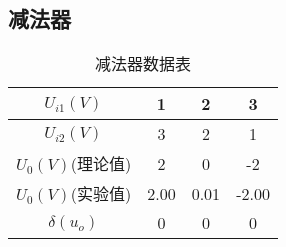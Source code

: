 \documentclass{article}
\begin{document}
      \subsection{减法器}
    \begin{table}[h]
        \centering  
        \begin{tabular}{c|c|c|c}
            \hline
                $U_{i1}(V)$      & 1    & 2   & 3  \\ \hline
                $U_{i2}(V)$       &   3        & 2        &1        \\ \hline
                $U_{0}(V)$(理论值)  &   2        &0         &-2      \\ \hline
                $U_{0}(V)$(实验值) &2.00&0.01&-2.00  \\ \hline
                $ \delta(u_o) $ &0&0&0 \\ \hline
        \end{tabular}
        \caption{减法器数据表}\label{SIGN}
        \end{table} 
        \newpage
\end{document}
